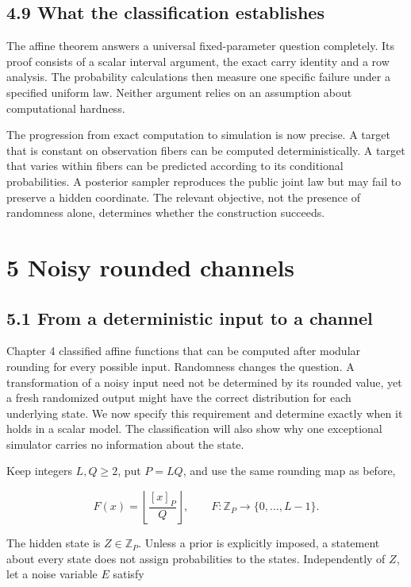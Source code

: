 \documentclass[
]{article}
\begin{document}
\subsection{4.9 What the classification
establishes}\label{what-the-classification-establishes}

The affine theorem answers a universal fixed-parameter question
completely. Its proof consists of a scalar interval argument, the exact
carry identity and a row analysis. The probability calculations then
measure one specific failure under a specified uniform law. Neither
argument relies on an assumption about computational hardness.

The progression from exact computation to simulation is now precise. A
target that is constant on observation fibers can be computed
deterministically. A target that varies within fibers can be predicted
according to its conditional probabilities. A posterior sampler
reproduces the public joint law but may fail to preserve a hidden
coordinate. The relevant objective, not the presence of randomness
alone, determines whether the construction succeeds.

\section{5 Noisy rounded channels}\label{noisy-rounded-channels}

\subsection{5.1 From a deterministic input to a
channel}\label{from-a-deterministic-input-to-a-channel}

Chapter 4 classified affine functions that can be computed after modular
rounding for every possible input. Randomness changes the question. A
transformation of a noisy input need not be determined by its rounded
value, yet a fresh randomized output might have the correct distribution
for each underlying state. We now specify this requirement and determine
exactly when it holds in a scalar model. The classification will also
show why one exceptional simulator carries no information about the
state.

Keep integers \(L,Q\ge2\), put \(P=LQ\), and use the same rounding map
as before,

\[
F(x)=\left\lfloor\frac{[x]_P}{Q}\right\rfloor,
\qquad F:\mathbb Z_P\longrightarrow\{0,\ldots,L-1\}.
\]

The hidden state is \(Z\in\mathbb Z_P\). Unless a prior is explicitly
imposed, a statement about every state does not assign probabilities to
the states. Independently of \(Z\), let a noise variable \(E\) satisfy
\end{document}
